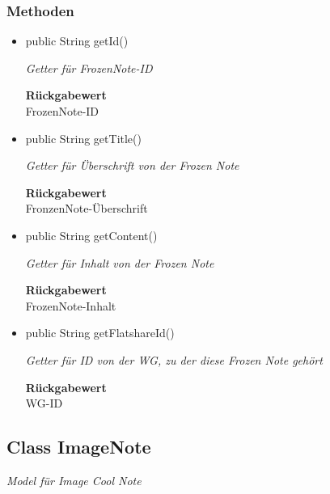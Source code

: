 \documentclass[a4paper]{scrreprt}
\begin{document}
        \subsubsection{Methoden}
        \begin{itemize}
        	\item{public String getId()}
        	
        	\textit{Getter für FrozenNote-ID}
        	
        	
        	
        	\textbf{Rückgabewert} \\
        	FrozenNote-ID        \item{public String getTitle()}
        	
        	\textit{Getter für Überschrift von der Frozen Note}
        	
        	
        	
        	\textbf{Rückgabewert} \\
        	FronzenNote-Überschrift        \item{public String getContent()}
        	
        	\textit{Getter für Inhalt von der Frozen Note}
        	
        	
        	
        	\textbf{Rückgabewert} \\
        	FrozenNote-Inhalt        \item{public String getFlatshareId()}
        	
        	\textit{Getter für ID von der WG, zu der diese Frozen Note gehört}
        	
        	
        	
        	\textbf{Rückgabewert} \\
        	WG-ID
        \end{itemize}
        \subsection{Class ImageNote}
        \textit{Model für Image Cool Note}
\end{document}
